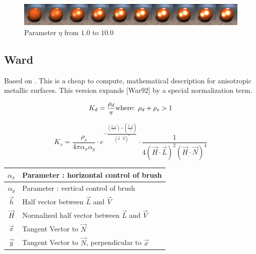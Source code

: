 \documentclass[11pt,a4paper]{article}
\begin{document}
\begin{figure}[H]
\includegraphics[width=\textwidth]{ctfresnelcomplete.png}
\caption{Parameter $\eta$ from $1.0$ to $10.0$}
\end{figure}


\newpage
\subsection{Ward}
Based on \cite{GMD10}. This is a cheap to compute, mathematical description for anisotropic metallic surfaces. This version expands [War92] by a special normalization term. 

\begin{equation}
K_d = \frac{\rho_d}{\pi} \\ \text{where: } \rho_d + \rho_s > 1
\end{equation}

\begin{equation}
K_s = \frac{\rho_s}{4 \pi \alpha_x \alpha_y } 
\cdot e^
{
- \frac{(\frac{\vec{h} \cdot \vec{x}}{\alpha_x})+(\frac{\vec{h} \cdot \vec{y}}{\alpha_y})}
{(\vec{h} \cdot \vec{N})^2}
}
\cdot 
\frac{1}{4 (\vec{H} \cdot \vec{L})^2 (\vec{H} \cdot \vec{N})^4}
\end{equation}

\begin{table}[H]
\begin{tabular}{| c | l |}
\hline
$\alpha_x$ & Parameter : horizontal control of brush\\ \hline
$\alpha_y$ & Parameter : vertical control of brush \\ \hline
$\vec{h}$ & Half vector between $\vec{L}$ and $\vec{V}$ \\ \hline
$\vec{H}$ & Normalized half vector between $\vec{L}$ and $\vec{V}$ \\ \hline
$\vec{x}$ & Tangent Vector to $\vec{N}$ \\ \hline
$\vec{y}$ & Tangent Vector to $\vec{N}$, perpendicular to $\vec{x}$ \\ \hline
\end{tabular}
\end{table}
\end{document}
